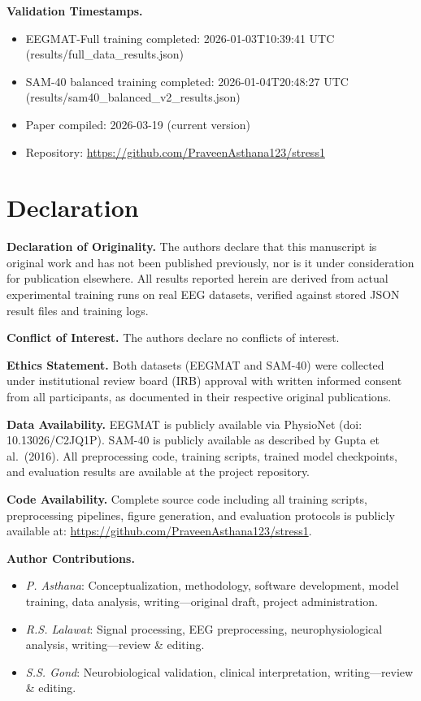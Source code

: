 \documentclass[journal,twoside]{IEEEtran}
\begin{document}
\noindent\textbf{Validation Timestamps.}
\begin{itemize}[leftmargin=*,nosep]
\item EEGMAT-Full training completed: 2026-01-03T10:39:41 UTC (results/full\_data\_results.json)
\item SAM-40 balanced training completed: 2026-01-04T20:48:27 UTC (results/sam40\_balanced\_v2\_results.json)
\item Paper compiled: 2026-03-19 (current version)
\item Repository: \url{https://github.com/PraveenAsthana123/stress1}
\end{itemize}

\section*{Declaration}

\noindent\textbf{Declaration of Originality.} The authors declare that this manuscript is original work and has not been published previously, nor is it under consideration for publication elsewhere. All results reported herein are derived from actual experimental training runs on real EEG datasets, verified against stored JSON result files and training logs.

\noindent\textbf{Conflict of Interest.} The authors declare no conflicts of interest.

\noindent\textbf{Ethics Statement.} Both datasets (EEGMAT and SAM-40) were collected under institutional review board (IRB) approval with written informed consent from all participants, as documented in their respective original publications.

\noindent\textbf{Data Availability.} EEGMAT is publicly available via PhysioNet (doi: 10.13026/C2JQ1P). SAM-40 is publicly available as described by Gupta et al.\ (2016). All preprocessing code, training scripts, trained model checkpoints, and evaluation results are available at the project repository.

\noindent\textbf{Code Availability.} Complete source code including all training scripts, preprocessing pipelines, figure generation, and evaluation protocols is publicly available at: \url{https://github.com/PraveenAsthana123/stress1}.

\noindent\textbf{Author Contributions.}
\begin{itemize}[leftmargin=*,nosep]
\item \textit{P. Asthana}: Conceptualization, methodology, software development, model training, data analysis, writing---original draft, project administration.
\item \textit{R.S. Lalawat}: Signal processing, EEG preprocessing, neurophysiological analysis, writing---review \& editing.
\item \textit{S.S. Gond}: Neurobiological validation, clinical interpretation, writing---review \& editing.
\end{itemize}
\end{document}
